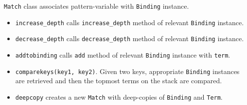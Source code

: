 \texttt{Match} class associates pattern-variable with \texttt{Binding} instance.

\begin{itemize}
\item
\texttt{increase\_depth} calls \texttt{increase\_depth} method of relevant \texttt{Binding} instance.

\item
\texttt{decrease\_depth} calls \texttt{decrease\_depth} method of relevant \texttt{Binding} instance.

\item
\texttt{addtobinding} calls \texttt{add} method of relevant \texttt{Binding} instance with \texttt{term}.

\item
\texttt{comparekeys(key1, key2)}. Given two keys, appropriate \texttt{Binding} instances are retrieved and then the topmost terms on the stack are compared.

\item
\texttt{deepcopy} creates a new \texttt{Match} with deep-copies of \texttt{Binding} and \texttt{Term}. 
\end{itemize}
